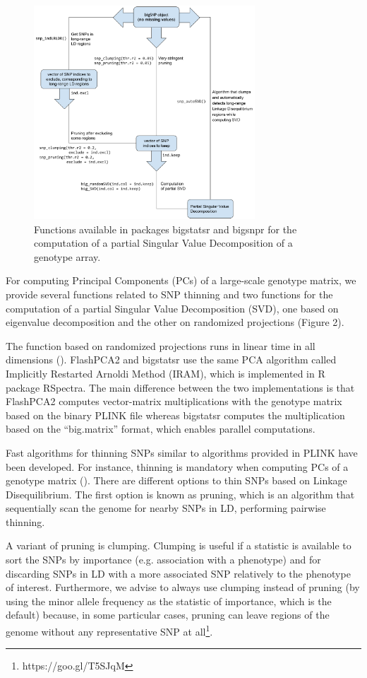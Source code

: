 \documentclass{bioinfo}
\begin{document}
\begin{methods}
\begin{figure}[!tpb]
\centerline{\includegraphics[width=235pt]{svd.pdf}}
\caption{Functions available in packages bigstatsr and bigsnpr for the computation of a partial Singular Value Decomposition of a genotype array.}\label{fig:svd}
\end{figure}

For computing Principal Components (PCs) of a large-scale genotype matrix, we provide several functions related to SNP thinning and two functions for the computation of a partial Singular Value Decomposition (SVD), one based on eigenvalue decomposition and the other on randomized projections (Figure 2).

The function based on randomized projections runs in linear time in all dimensions (\cite{Lehoucq1996}). FlashPCA2 and bigstatsr use the same PCA algorithm called Implicitly Restarted Arnoldi Method (IRAM), which is implemented in R package RSpectra. The main difference between the two implementations is that FlashPCA2 computes vector-matrix multiplications with the genotype matrix based on the binary PLINK file whereas bigstatsr computes the multiplication based on the ``big.matrix'' format, which enables parallel computations. 
 
Fast algorithms for thinning SNPs  similar to algorithms provided in PLINK have been developed. For instance, thinning is mandatory when computing PCs of a genotype matrix (\cite{Abdellaoui2013}). There are different options to thin SNPs based on Linkage Disequilibrium. The first option is known as pruning, which is an algorithm that sequentially scan the genome for nearby SNPs in LD, performing pairwise thinning.

A variant of pruning is clumping. Clumping is useful if a statistic is available to sort the SNPs by importance (e.g. association with a phenotype) and for discarding SNPs in LD with a more associated SNP relatively to the phenotype of interest. Furthermore, we advise to always use clumping instead of pruning (by using the minor allele frequency as the statistic of importance, which is the default) because, in some particular cases, pruning can leave regions of the genome without any representative SNP at all\footnote{https://goo.gl/T5SJqM}.


\end{methods}
\end{document}
